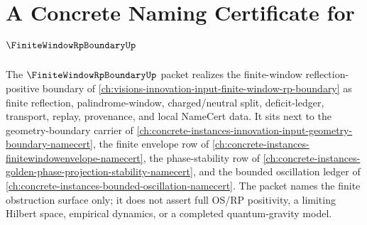 \chapter{A Concrete Naming Certificate for $\FiniteWindowRpBoundaryUp$}
\label{ch:concrete-instances-finite-window-rp-boundary-namecert}

The $\FiniteWindowRpBoundaryUp$ packet realizes the finite-window reflection-positive boundary of \autoref{ch:visions-innovation-input-finite-window-rp-boundary} as finite reflection, palindrome-window, charged/neutral split, deficit-ledger, transport, replay, provenance, and local NameCert data. It sits next to the geometry-boundary carrier of \autoref{ch:concrete-instances-innovation-input-geometry-boundary-namecert}, the finite envelope row of \autoref{ch:concrete-instances-finitewindowenvelope-namecert}, the phase-stability row of \autoref{ch:concrete-instances-golden-phase-projection-stability-namecert}, and the bounded oscillation ledger of \autoref{ch:concrete-instances-bounded-oscillation-namecert}. The packet names the finite obstruction surface only; it does not assert full OS/RP positivity, a limiting Hilbert space, empirical dynamics, or a completed quantum-gravity model.

